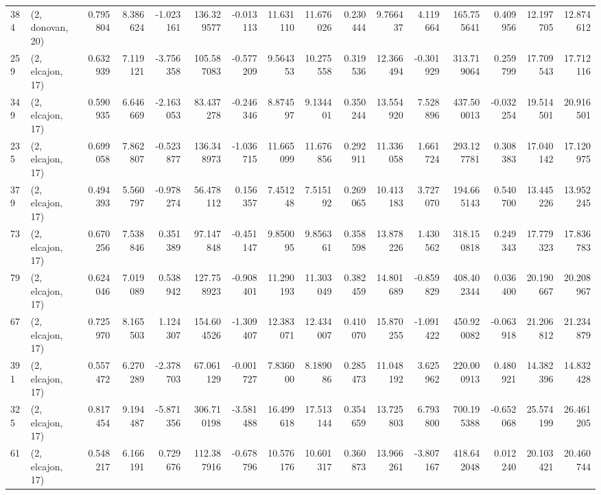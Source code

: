 \begin{tabular}{llrrrrrrrrrrrrrr}
384 &  (2, donovan, 20) &   0.795804 &   8.386624 &  -1.023161 &   136.329577 &  -0.013113 &  11.631110 &  11.676026 &  0.230444 &   9.766437 &   4.119664 &   165.755641 &   0.409956 &  12.197705 &  12.874612 \\
259 &  (2, elcajon, 17) &   0.632939 &   7.119121 &  -3.756358 &   105.587083 &  -0.577209 &   9.564353 &  10.275558 &  0.319536 &  12.366494 &  -0.301929 &   313.719064 &   0.259799 &  17.709543 &  17.712116 \\
349 &  (2, elcajon, 17) &   0.590935 &   6.646669 &  -2.163053 &    83.437278 &  -0.246346 &   8.874597 &   9.134401 &  0.350244 &  13.554920 &   7.528896 &   437.500013 &  -0.032254 &  19.514501 &  20.916501 \\
235 &  (2, elcajon, 17) &   0.699058 &   7.862807 &  -0.523877 &   136.348973 &  -1.036715 &  11.665099 &  11.676856 &  0.292911 &  11.336058 &   1.661724 &   293.127781 &   0.308383 &  17.040142 &  17.120975 \\
379 &  (2, elcajon, 17) &   0.494393 &   5.560797 &  -0.978274 &    56.478112 &   0.156357 &   7.451248 &   7.515192 &  0.269065 &  10.413183 &   3.727070 &   194.665143 &   0.540700 &  13.445226 &  13.952245 \\
73  &  (2, elcajon, 17) &   0.670256 &   7.538846 &   0.351389 &    97.147848 &  -0.451147 &   9.850095 &   9.856361 &  0.358598 &  13.878226 &   1.430562 &   318.150818 &   0.249343 &  17.779323 &  17.836783 \\
79  &  (2, elcajon, 17) &   0.624046 &   7.019089 &   0.538942 &   127.758923 &  -0.908401 &  11.290193 &  11.303049 &  0.382459 &  14.801689 &  -0.859829 &   408.402344 &   0.036400 &  20.190667 &  20.208967 \\
67  &  (2, elcajon, 17) &   0.725970 &   8.165503 &   1.124307 &   154.604526 &  -1.309407 &  12.383071 &  12.434007 &  0.410070 &  15.870255 &  -1.091422 &   450.920082 &  -0.063918 &  21.206812 &  21.234879 \\
391 &  (2, elcajon, 17) &   0.557472 &   6.270289 &  -2.378703 &    67.061129 &  -0.001727 &   7.836000 &   8.189086 &  0.285473 &  11.048192 &   3.625962 &   220.000913 &   0.480921 &  14.382396 &  14.832428 \\
325 &  (2, elcajon, 17) &   0.817454 &   9.194487 &  -5.871356 &   306.710198 &  -3.581488 &  16.499618 &  17.513144 &  0.354659 &  13.725803 &   6.793800 &   700.195388 &  -0.652068 &  25.574199 &  26.461205 \\
61  &  (2, elcajon, 17) &   0.548217 &   6.166191 &   0.729676 &   112.387916 &  -0.678796 &  10.576176 &  10.601317 &  0.360873 &  13.966261 &  -3.807167 &   418.642048 &   0.012240 &  20.103421 &  20.460744 \\

\end{tabular}
